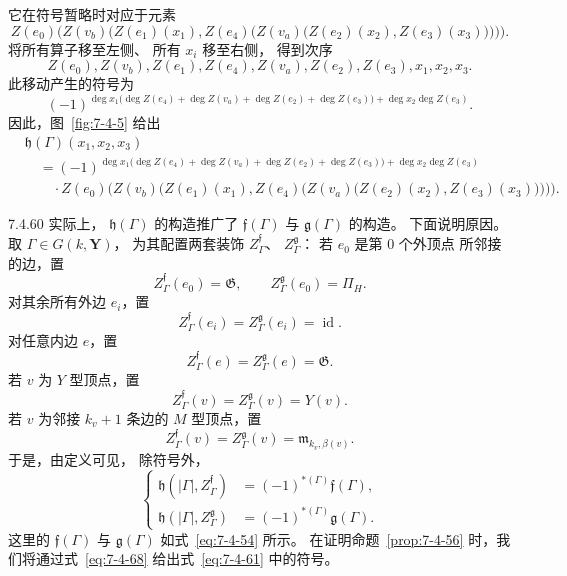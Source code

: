 
它在符号暂略时对应于元素
\[
Z(e_0)\bigl(
Z(v_b)\bigl(
Z(e_1)(x_1),
Z(e_4)\bigl(
Z(v_a)\bigl(
Z(e_2)(x_2),Z(e_3)(x_3)
\bigr)\bigr)\bigr)\bigr).
\]
将所有算子移至左侧、
所有 $x_i$ 移至右侧，
得到次序
\[
Z(e_0),Z(v_b),Z(e_1),
Z(e_4),Z(v_a),Z(e_2),Z(e_3),
x_1,x_2,x_3.
\]
此移动产生的符号为
\[
(-1)^{
\deg x_1
\bigl(
\deg Z(e_4)+\deg Z(v_a)
+\deg Z(e_2)+\deg Z(e_3)
\bigr)
+\deg x_2\deg Z(e_3)
}.
\]
因此，图~\ref{fig:7-4-5}
给出
\[
\begin{aligned}
&\mathfrak h(\Gamma)(x_1,x_2,x_3)\\
&\quad=(-1)^{
\deg x_1
\bigl(
\deg Z(e_4)+\deg Z(v_a)
+\deg Z(e_2)+\deg Z(e_3)
\bigr)
+\deg x_2\deg Z(e_3)
}\\
&\qquad\cdot
Z(e_0)\bigl(
Z(v_b)\bigl(
Z(e_1)(x_1),
Z(e_4)\bigl(
Z(v_a)\bigl(
Z(e_2)(x_2),Z(e_3)(x_3)
\bigr)\bigr)\bigr)\bigr).
\end{aligned}
\]

\begin{remark}{7.4.60}\label{rem:7-4-60}
实际上，
$\mathfrak h(\Gamma)$
的构造推广了
$\mathfrak f(\Gamma)$ 与
$\mathfrak g(\Gamma)$
的构造。
下面说明原因。
取 $\Gamma\in G(k,\mathbf Y)$，
为其配置两套装饰
$Z_\Gamma^{\mathfrak f}$、
$Z_\Gamma^{\mathfrak g}$：
若 $e_0$ 是第 $0$ 个外顶点
所邻接的边，置
\[
Z_\Gamma^{\mathfrak f}(e_0)=\mathfrak G,
\qquad
Z_\Gamma^{\mathfrak g}(e_0)=\Pi_H.
\]
对其余所有外边 $e_i$，置
\[
Z_\Gamma^{\mathfrak f}(e_i)
=Z_\Gamma^{\mathfrak g}(e_i)
=\operatorname{id}.
\]
对任意内边 $e$，置
\[
Z_\Gamma^{\mathfrak f}(e)
=Z_\Gamma^{\mathfrak g}(e)
=\mathfrak G.
\]
若 $v$ 为 $Y$ 型顶点，置
\[
Z_\Gamma^{\mathfrak f}(v)
=Z_\Gamma^{\mathfrak g}(v)
=Y(v).
\]
若 $v$ 为邻接 $k_v+1$
条边的 $M$ 型顶点，置
\[
Z_\Gamma^{\mathfrak f}(v)
=Z_\Gamma^{\mathfrak g}(v)
=\mathfrak m_{k_v,\beta(v)}.
\]
于是，由定义可见，
除符号外，
\begin{equation}
\left\{
\begin{aligned}
\mathfrak h(|\Gamma|,Z_\Gamma^{\mathfrak f})
&=(-1)^{*(\Gamma)}\mathfrak f(\Gamma),\\
\mathfrak h(|\Gamma|,Z_\Gamma^{\mathfrak g})
&=(-1)^{*(\Gamma)}\mathfrak g(\Gamma).
\end{aligned}
\right.
\tag{7.4.61}\label{eq:7-4-61}
\end{equation}
这里的 $\mathfrak f(\Gamma)$ 与
$\mathfrak g(\Gamma)$
如式~\eqref{eq:7-4-54} 所示。
在证明命题~\ref{prop:7-4-56}
时，我们将通过式~\eqref{eq:7-4-68}
给出式~\eqref{eq:7-4-61}
中的符号。
\end{remark}

